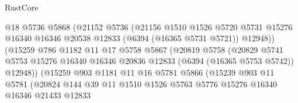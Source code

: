 \begin{lexlean}{RustCore}
\begin{coremodule}
                                @18
                                @5736
                                @5868
                                (@21152
                                  @5736
                                  (@21156
                                    @1510
                                    @1526
                                    @5720
                                    @5731
                                    @15276
                                    @16340
                                    @16346
                                    @20538
                                    @12833
                                    (@6394 (@16365 @5731 @5721))
                                    @12948))
                                (@15259
                                  @786
                                  @1182
                                  @11
                                  @17
                                  @5758
                                  @5867
                                  (@20819
                                    @5758
                                    (@20829
                                      @5741
                                      @5753
                                      @15276
                                      @16340
                                      @16346
                                      @20836
                                      @12833
                                      (@6394 (@16365 @5753 @5742))
                                      @12948))
                                  (@15259
                                    @903
                                    @1181
                                    @11
                                    @16
                                    @5781
                                    @5866
                                    (@15239
                                      @903
                                      @11
                                      @5781
                                      (@20824
                                        @144
                                        @39
                                        @11
                                        @1510
                                        @1526
                                        @5763
                                        @5776
                                        @15276
                                        @16340
                                        @16346
                                        @21433
                                        @12833

\end{coremodule}
\end{lexlean}

